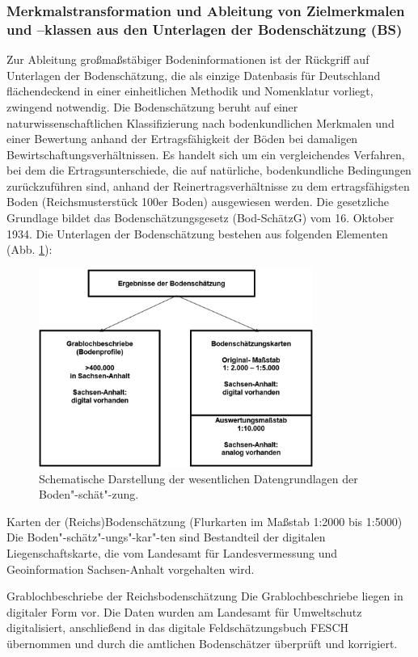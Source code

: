 \subsubsection{Merkmalstransformation und Ableitung von Zielmerkmalen und –klassen aus den Unterlagen der Bodenschätzung (BS)}\label{sec:trans-bs}
Zur Ableitung großmaßstäbiger Bodeninformationen ist der Rückgriff auf Unterlagen der Bodenschätzung, die als einzige Datenbasis für Deutschland flächendeckend in einer einheitlichen Methodik und Nomenklatur vorliegt, zwingend notwendig. Die Bodenschätzung beruht auf einer naturwissenschaftlichen Klassifizierung nach bodenkundlichen Merkmalen und einer Bewertung anhand der Ertragsfähigkeit der Böden bei damaligen Bewirtschaftungsverhältnissen. Es handelt sich um ein vergleichendes Verfahren, bei dem die Ertragsunterschiede, die auf natürliche, bodenkundliche Bedingungen zurückzuführen sind, anhand der Reinertragsverhältnisse zu dem ertragsfähigsten Boden (Reichsmusterstück 100er Boden) ausgewiesen werden. Die gesetzliche Grundlage bildet das Bodenschätzungsgesetz (Bod-SchätzG) vom 16. Oktober 1934. Die Unterlagen der Bodenschätzung bestehen aus folgenden Elementen (Abb. \ref{fig:bs-struktur}):

\begin{figure}[t]
\centering\includegraphics[width=0.8\textwidth]{figures/bodenschaetzung}
\caption{Schematische Darstellung der wesentlichen Datengrundlagen der Boden"-schät"-zung.}\label{fig:bs-struktur}
\end{figure}

\begin{compactdesc}
\item[Karten der (Reichs)Bodenschätzung] (Flurkarten im Maßstab 1:2000 bis 1:5000) Die Boden"-schätz"-ungs"-kar"-ten sind Bestandteil der digitalen Liegenschaftskarte, die  vom Landesamt für Landesvermessung und Geoinformation Sachsen-Anhalt vorgehalten wird.
\item[Grablochbeschriebe der Reichsbodenschätzung]  Die Grablochbeschriebe liegen in digitaler Form vor. Die Daten wurden am Landesamt für Umweltschutz digitalisiert, anschließend in das digitale Feldschätzungsbuch FESCH übernommen und durch die amtlichen Bodenschätzer überprüft und korrigiert.
\end{compactdesc}


